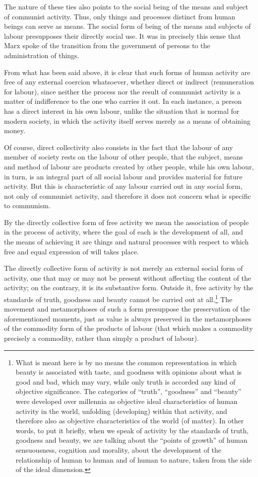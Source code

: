 \documentclass[../main]{subfiles}
\begin{document}
The nature of these ties also points to the social being of the means and subject of communist activity. Thus, only things and processes distinct from human beings can serve as means. The social form of being of the means and subjects of labour presupposes their directly social use. It was in precisely this sense that Marx spoke of the transition from the government of persons to the administration of things.

From what has been said above, it is clear that such forms of human activity are free of any external coercion whatsoever, whether direct or indirect (remuneration for labour), since neither the process nor the result of communist activity is a matter of indifference to the one who carries it out. In each instance, a person has a direct interest in his own labour, unlike the situation that is normal for modern society, in which the activity itself serves merely as a means of obtaining money.

Of course, direct collectivity also consists in the fact that the labour of any member of society rests on the labour of other people, that the subject, means and method of labour are products created by other people, while his own labour, in turn, is an integral part of all social labour and provides material for future activity. But this is characteristic of any labour carried out in any social form, not only of communist activity, and therefore it does not concern what is specific to communism.

By the directly collective form of free activity we mean the association of people in the process of activity, where the goal of each is the development of all, and the means of achieving it are things and natural processes with respect to which free and equal expression of will takes place.

The directly collective form of activity is not merely an external social form of activity, one that may or may not be present without affecting the content of the activity; on the contrary, it is its substantive form. Outside it, free activity by the standards of truth, goodness and beauty cannot be carried out at all.\footnote{What is meant here is by no means the common representation in which beauty is associated with taste, and goodness with opinions about what is good and bad, which may vary, while only truth is accorded any kind of objective significance. The categories of “truth”, “goodness” and “beauty” were developed over millennia as objective ideal characteristics of human activity in the world, unfolding (developing) within that activity, and therefore also as objective characteristics of the world (of matter). In other words, to put it briefly, when we speak of activity by the standards of truth, goodness and beauty, we are talking about the “points of growth” of human sensuousness, cognition and morality, about the development of the relationship of human to human and of human to nature, taken from the side of the ideal dimension.} The movement and metamorphoses of such a form presuppose the preservation of the aforementioned moments, just as value is always preserved in the metamorphoses of the commodity form of the products of labour (that which makes a commodity precisely a commodity, rather than simply a product of labour).
\end{document}
